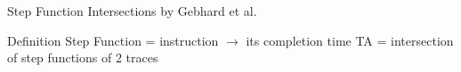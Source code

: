 \documentclass{beamer}
\begin{document}
\begin{frame}{Step Function Intersections by Gebhard et al.}
    \begin{block}{Definition}
        Step Function = instruction $\rightarrow$ its completion time
        TA = intersection of step functions of 2 traces
    \end{block}

    
\end{frame}
\end{document}
